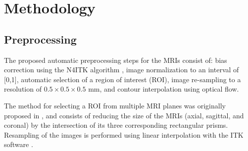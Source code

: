 \section{Methodology}
\label{sec:methods}



\subsection{Preprocessing}
\label{subsec:prepro}
The proposed automatic preprocessing steps for the MRIs consist of:
bias correction using the N4ITK algorithm \cite{n4itk}, 
image normalization to an interval of [0,1],
automatic selection of a region of interest (ROI), 
image re-sampling to a resolution of $0.5 \times 0.5 \times 0.5$ mm, 
and contour interpolation using optical flow.

The method for selecting a ROI from multiple MRI planes was originally proposed in \cite{anneke}, and consists of reducing the size of the MRIs 
(axial, sagittal, and coronal)
by the intersection of its three corresponding rectangular prisms. Resampling
of the images is performed using linear interpolation with the ITK software \cite{itk}. 

